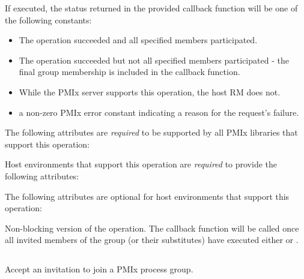 If executed, the status returned in the provided callback function will be one of the following constants:

\begin{itemize}
\item {} The operation succeeded and all specified members participated.
\item {} The operation succeeded but not all specified members participated - the final group membership is included in the callback function.
\item {} While the \ac{PMIx} server supports this operation, the host \ac{RM} does not.
\item a non-zero \ac{PMIx} error constant indicating a reason for the request's failure.
\end{itemize}

\reqattrstart
The following attributes are \textit{required} to be supported by all \ac{PMIx} libraries that support this operation:


Host environments that support this operation are \textit{required} to provide the following attributes:


\reqattrend

\optattrstart
The following attributes are optional for host environments that support this operation:


\optattrend

\descr

Non-blocking version of the  operation. The callback function will be called once all invited members of the group (or their substitutes) have executed either  or .

\subsection{}

\summary

Accept an invitation to join a \ac{PMIx} process group.

